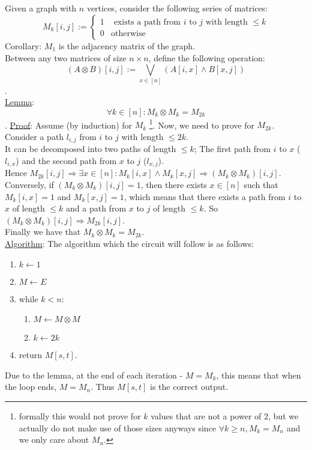 \subsection{}
Given a graph with $n$ vertices, 
consider the following series of matrices:\\
\[
	M_k[i,j]:=
	\begin{cases}
		1 & \text{ exists a path from } i \text{ to } j \text{ with length } \leq k\\
		0 & \text{otherwise}
	\end{cases}
\]
Corollary: $M_1$ is the adjacency matrix of the graph.\\
Between any two matrices of size $n\times n$, define the following operation:
\[(A\otimes B)[i,j]:=\bigvee_{x\in [n]}\left(A[i, x]\wedge B[x, j]\right)\].\\

\underline{Lemma}:
\[\forall k\in[n]: M_k\otimes M_k=M_{2k}\].
\underline{Proof}:
Assume (by induction) for $M_k$
\footnote{formally this would not prove for
$k$ values that are not a power of $2$,
but we actually do not make use of those sizes anyways
since $\forall k\geq n, M_k=M_n$ and we only care about $M_n$.}.
Now, we need to prove for $M_{2k}$. Consider a path $l_{i,j}$
from $i$ to $j$ with length $\leq 2k$.\\
It can be decomposed into two paths of length $\leq k$;
The first path from $i$ to $x$ ($l_{i,x}$) and the second path from $x$ to $j$ ($l_{x,j}$).\\
Hence $M_{2k}[i,j]\Rightarrow \exists x\in[n]: M_k[i,x]\wedge M_k[x,j]\Rightarrow (M_k\otimes M_k)[i,j]$.\\
Conversely, if $(M_k\otimes M_k)[i,j]=1$, then there exists $x\in[n]$ such that $M_k[i,x]=1$ and $M_k[x,j]=1$,
which means that there exists a path from $i$ to $x$ of length $\leq k$ and a path from $x$ to $j$ of length $\leq k$.
So $(M_k\otimes M_k)[i,j]\Rightarrow M_{2k}[i,j]$.\\
Finally we have that $M_{k}\otimes M_{k}=M_{2k}$.\\

\underline{Algorithm}:
The algorithm which the circuit will follow is as follows:\\
\begin{enumerate}
	\item $k\leftarrow 1$
	\item $M\leftarrow E$
	\item while $k<n$:
	\begin{enumerate}
		\item $M\leftarrow M\otimes M$
		\item $k\leftarrow 2k$
	\end{enumerate}
	\item return $M[s,t]$.
\end{enumerate}
Due to the lemma, at the end of each iteration - $M=M_k$,
this means that when the loop ends, $M=M_n$.
Thus $M[s,t]$ is the correct output.\\

